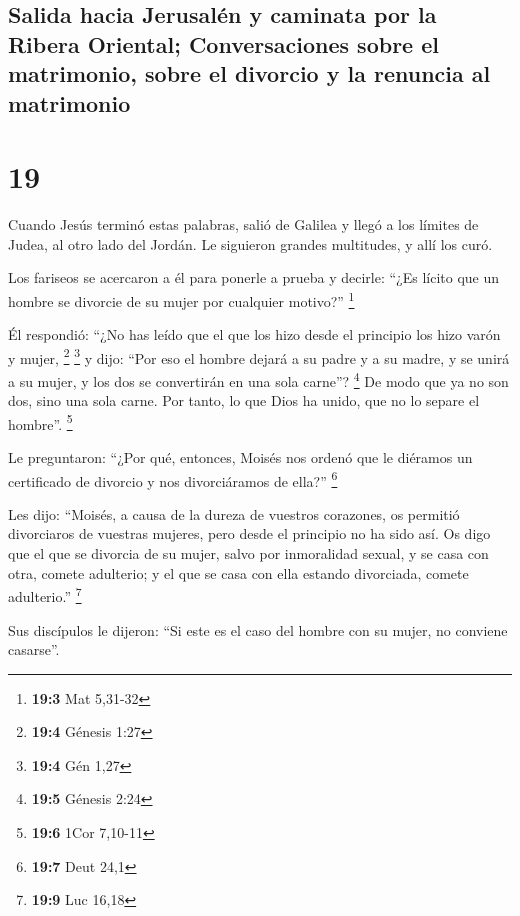 \begin{paracol}{2}
{\subsection{Salida hacia Jerusalén y caminata por la Ribera Oriental;
Conversaciones sobre el matrimonio, sobre el divorcio y la renuncia al
matrimonio}\label{salida-hacia-jerusaluxe9n-y-caminata-por-la-ribera-oriental-conversaciones-sobre-el-matrimonio-sobre-el-divorcio-y-la-renuncia-al-matrimonio}}

\hypertarget{section-36}{%
\section{19}\label{section-36}}

 Cuando Jesús terminó estas palabras, salió de Galilea y
llegó a los límites de Judea, al otro lado del Jordán.  Le
siguieron grandes multitudes, y allí los curó.

 Los fariseos se acercaron a él para ponerle a prueba y
decirle: ``¿Es lícito que un hombre se divorcie de su mujer por
cualquier motivo?'' \footnote{\textbf{19:3} Mat 5,31-32}

 Él respondió: ``¿No has leído que el que los hizo desde
el principio los hizo varón y mujer, \footnote{\textbf{19:4} Génesis
  1:27} \footnote{\textbf{19:4} Gén 1,27}  y dijo: ``Por
eso el hombre dejará a su padre y a su madre, y se unirá a su mujer, y
los dos se convertirán en una sola carne''? \footnote{\textbf{19:5}
  Génesis 2:24}  De modo que ya no son dos, sino una sola
carne. Por tanto, lo que Dios ha unido, que no lo separe el hombre''.
\footnote{\textbf{19:6} 1Cor 7,10-11}

 Le preguntaron: ``¿Por qué, entonces, Moisés nos ordenó
que le diéramos un certificado de divorcio y nos divorciáramos de
ella?'' \footnote{\textbf{19:7} Deut 24,1}

 Les dijo: ``Moisés, a causa de la dureza de vuestros
corazones, os permitió divorciaros de vuestras mujeres, pero desde el
principio no ha sido así.  Os digo que el que se divorcia
de su mujer, salvo por inmoralidad sexual, y se casa con otra, comete
adulterio; y el que se casa con ella estando divorciada, comete
adulterio.'' \footnote{\textbf{19:9} Luc 16,18}

 Sus discípulos le dijeron: ``Si este es el caso del
hombre con su mujer, no conviene casarse''.


\end{paracol}
